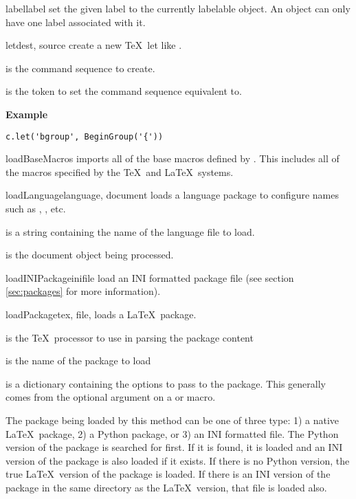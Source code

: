 \begin{methoddesc}[Context]{label}{label}
set the given label to the currently labelable object.  An object can 
only have one label associated with it.
\end{methoddesc}

\begin{methoddesc}[Context]{let}{dest, source}
create a new \TeX\ let like .

 is the command sequence to create.

 is the token to set the command sequence equivalent to.

\textbf{Example}
\begin{verbatim}
c.let('bgroup', BeginGroup('{'))
\end{verbatim}
\end{methoddesc}

\begin{methoddesc}[Context]{loadBaseMacros}{}
imports all of the base macros defined by \plasTeX.  This includes all of
the macros specified by the \TeX\ and \LaTeX\ systems.
\end{methoddesc}

\begin{methoddesc}[Context]{loadLanguage}{language, document}
loads a language package to configure names such as ,
, etc.

 is a string containing the name of the language file to load.

 is the document object being processed.
\end{methoddesc}

\begin{methoddesc}[Context]{loadINIPackage}{inifile}
load an INI formatted package file (see section \ref{sec:packages} for 
more information).
\end{methoddesc}

\begin{methoddesc}[Context]{loadPackage}{tex, file, }
loads a \LaTeX\ package.  

 is the \TeX\ processor to use in parsing the package content

 is the name of the package to load

 is a dictionary containing the options to pass to the package.
This generally comes from the optional argument on a 
or  macro.

The package being loaded by this method can be one of three type: 1)
a native \LaTeX\ package, 2) a Python package, or 3) an INI formatted file.
The Python version of the package is searched for first.  If it is found,
it is loaded and an INI version of the package is also loaded if it
exists.  If there is no Python version, the true \LaTeX\ version of the
package is loaded.  If there is an INI version of the package in the same
directory as the \LaTeX\ version, that file is loaded also.
\end{methoddesc}

